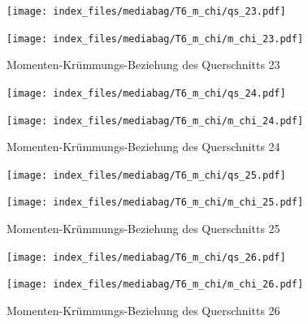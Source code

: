 \documentclass[
  11pt,
  letterpaper,
]{scrreprt}
\begin{document}
\begin{figure}[H]

\begin{minipage}{0.50\linewidth}
\texttt{[image: index\_files/mediabag/T6\_m\_chi/qs\_23.pdf]}\end{minipage}%
%
\begin{minipage}{0.50\linewidth}
\texttt{[image: index\_files/mediabag/T6\_m\_chi/m\_chi\_23.pdf]}\end{minipage}%

\caption{\label{fig-m_chi_appendix}Momenten-Krümmungs-Beziehung des
Querschnitts 23}

\end{figure}%

\begin{figure}[H]

\begin{minipage}{0.50\linewidth}
\texttt{[image: index\_files/mediabag/T6\_m\_chi/qs\_24.pdf]}\end{minipage}%
%
\begin{minipage}{0.50\linewidth}
\texttt{[image: index\_files/mediabag/T6\_m\_chi/m\_chi\_24.pdf]}\end{minipage}%

\caption{\label{fig-m_chi_appendix}Momenten-Krümmungs-Beziehung des
Querschnitts 24}

\end{figure}%

\begin{figure}[H]

\begin{minipage}{0.50\linewidth}
\texttt{[image: index\_files/mediabag/T6\_m\_chi/qs\_25.pdf]}\end{minipage}%
%
\begin{minipage}{0.50\linewidth}
\texttt{[image: index\_files/mediabag/T6\_m\_chi/m\_chi\_25.pdf]}\end{minipage}%

\caption{\label{fig-m_chi_appendix}Momenten-Krümmungs-Beziehung des
Querschnitts 25}

\end{figure}%

\begin{figure}[H]

\begin{minipage}{0.50\linewidth}
\texttt{[image: index\_files/mediabag/T6\_m\_chi/qs\_26.pdf]}\end{minipage}%
%
\begin{minipage}{0.50\linewidth}
\texttt{[image: index\_files/mediabag/T6\_m\_chi/m\_chi\_26.pdf]}\end{minipage}%

\caption{\label{fig-m_chi_appendix}Momenten-Krümmungs-Beziehung des
Querschnitts 26}

\end{figure}%
\end{document}
